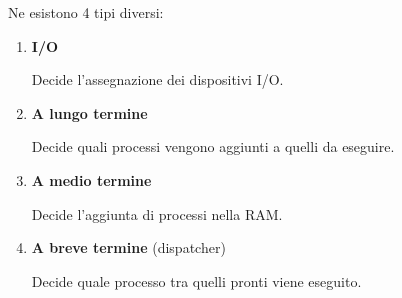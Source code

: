 \documentclass{article}
\begin{document}
\noindent Ne esistono 4 tipi diversi:
\begin{enumerate}

    \item \textbf{I/O}

    Decide l'assegnazione dei dispositivi I/O.

    \item \textbf{A lungo termine}

        Decide quali processi vengono aggiunti a quelli da eseguire.
    
    \item \textbf{A medio termine}

        Decide l'aggiunta di processi nella RAM.
    
    \item \textbf{A breve termine} (dispatcher)

        Decide quale processo tra quelli pronti viene eseguito.\newline
    
\end{enumerate}

\newpage
\end{document}
